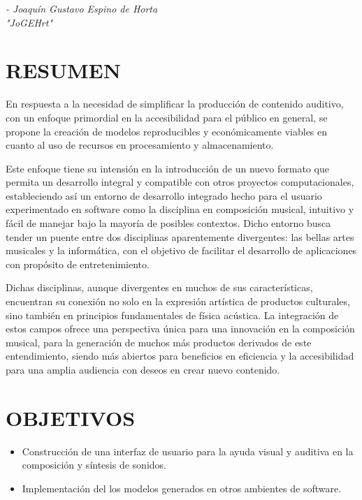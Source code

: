 \documentclass{book}
\begin{document}
	\begin{flushright}\emph{- Joaquín Gustavo Espino de Horta}\\ \emph{"JoGEHrt"}\end{flushright}
	
	\pagebreak\section*{RESUMEN}
	En respuesta a la necesidad de simplificar la producción de contenido auditivo, con un enfoque primordial en la accesibilidad para el público en general, se propone la creación de modelos reproducibles y económicamente viables en cuanto al uso de recursos en procesamiento y almacenamiento.\par
	Este enfoque tiene su intensión en la introducción de un nuevo formato que permita un desarrollo integral y compatible con otros proyectos computacionales, estableciendo así un entorno de desarrollo integrado hecho para el usuario experimentado en software como la disciplina en composición musical, intuitivo y fácil de manejar bajo la mayoría de posibles contextos. Dicho entorno busca tender un puente entre dos disciplinas aparentemente divergentes: las bellas artes musicales y la informática, con el objetivo de facilitar el desarrollo de aplicaciones con propósito de entretenimiento.\par
	Dichas disciplinas, aunque divergentes en muchos de sus características, encuentran su conexión no solo en la expresión artística de productos culturales, sino también en principios fundamentales de física acústica. La integración de estos campos ofrece una perspectiva única para una innovación en la composición musical, para la generación de muchos más productos derivados de este entendimiento, siendo más abiertos para beneficios en eficiencia y la accesibilidad para una amplia audiencia con deseos en crear nuevo contenido.\par
	\section*{OBJETIVOS}
	\begin{itemize}
		\item Construcción de una interfaz de usuario para la ayuda visual y auditiva en la composición y síntesis de sonidos.
		\item Implementación del los modelos generados en otros ambientes de software.
	\end{itemize}\setcounter{page}{0}
	\tableofcontents\pagebreak
\end{document}
